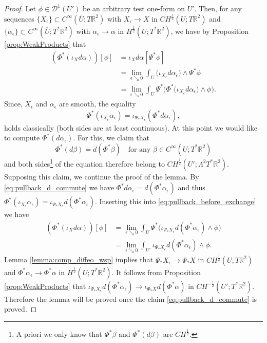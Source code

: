 \documentclass[10pt,a4paper]{amsart}
\newcommand{\R}{\mathbb{R}}
\begin{document}
    \begin{proof}
        Let $\phi \in \mathcal{D}^1(U')$ be an arbitrary test one-form on $U'$. Then, for any sequences $\{X_\epsilon\} \subset C^\infty(\overline U;T\R^2)$ with $X_\epsilon \to X$ in $CH^\frac12(U;T\R^2)$ and $\{\alpha_\epsilon\} \subset C^\infty(\overline U;T^*\R^2)$ with $\alpha_\epsilon \to \alpha$ in $H^\frac12(U;T^*\R^2)$, we have by Proposition \ref{prop:WeakProducts} that
        \begin{align} 
                (\Phi^*(\iota_X d\alpha))[\phi] &= \iota_X d\alpha[\Psi^*\phi]\nonumber\\
                    &= \lim_{\epsilon \searrow 0} \int_U \big( \iota_{X_\epsilon}d\alpha_\epsilon\big) \wedge \Psi^*\phi\nonumber\\
                    &= \lim_{\epsilon \searrow 0} \int_U \Psi^*\Big( \Phi^*\big( \iota_{X_\epsilon}d\alpha_\epsilon\big) \wedge \phi\Big).
                    \label{eq:pullback_before_exchange}
        \end{align}
        Since, $X_\epsilon$ and $\alpha_\epsilon$ are smooth, the equality
        \begin{equation*}
            \Phi^*(\iota_{X_\epsilon} \alpha_\epsilon) = \iota_{\Psi_*X_\epsilon} (\Phi^*d\alpha_\epsilon),
        \end{equation*}
        holds classically (both sides are at least continuous). At this point we would like to compute $\Phi^*(d\alpha_\epsilon)$. For this, we claim  that
        \begin{equation} \label{eq:pullback_d_commute}
            \Phi^*(d\beta) = d(\Phi^*\beta) \quad \text{for any } \beta \in C^\infty(U;T^*\R^2)
        \end{equation}
        and both sides\footnote{A priori we only know that $\Phi^*\beta$ and $\Phi^*(d\beta)$ are $CH^\frac12$.} of the equation therefore belong to $CH^\frac12(U';\Lambda^2 T^* \R^2)$. Supposing this claim, we continue the proof of the lemma. By \eqref{eq:pullback_d_commute} we have 
        $\Phi^* d\alpha_\epsilon = d(\Phi^*\alpha_\epsilon)$ and thus $\Phi^*(\iota_{X_\epsilon} \alpha_\epsilon) = \iota_{\Psi_*X_\epsilon} d(\Phi^*\alpha_\epsilon)$. Inserting this into \eqref{eq:pullback_before_exchange} we have
        \begin{align*}
            (\Phi^*(\iota_X d\alpha))[\phi] &= \lim_{\epsilon \searrow 0} \int_U \Psi^* \big( \iota_{\Psi_*X_\epsilon}d(\Phi^*\alpha_\epsilon) \wedge \phi\big)\\
            &= \lim_{\epsilon \searrow 0} \int_{U'} \iota_{\Psi_*X_\epsilon}d(\Phi^*\alpha_\epsilon) \wedge \phi.
        \end{align*}
        Lemma \ref{lemma:comp_diffeo_wsp} implies that $\Psi_*X_\epsilon \to \Psi_*X$ in $CH^\frac12(U;T\R^2)$ and $\Phi^*\alpha_\epsilon \to \Phi^*\alpha$ in $H^\frac12(U;T^*\R^2)$. It follows from Proposition \ref{prop:WeakProducts} that $\iota_{\Psi_*X_\epsilon} d(\Phi^*\alpha_\epsilon) \to \iota_{\Phi_*X} d(\Phi^*\alpha)$ in $CH^{-\frac12}(U';T^*\R^2)$. Therefore the lemma will be proved once the claim \eqref{eq:pullback_d_commute} is proved.
        

\end{proof}
\end{document}
